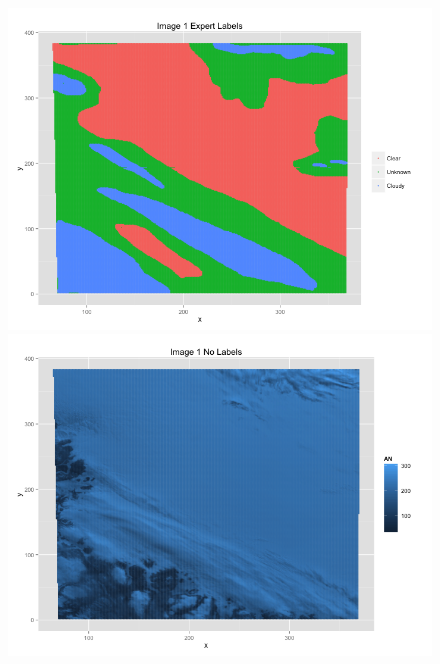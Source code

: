 \documentclass{article}\usepackage[]{graphicx}\usepackage[]{color}
\begin{document}
\begin{figure}
\includegraphics[scale = .35]{Image1Experts.png}
\includegraphics[scale = .35]{Image1Raw.png}


\end{figure}
\end{document}
